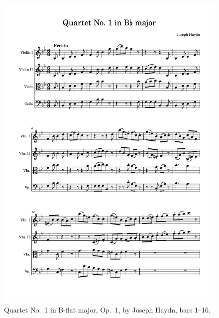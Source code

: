 \documentclass[12pt]{article}
\theoremstyle{definition}
\begin{document}
\begin{figure}
    \includegraphics[width=\textwidth,page=1]{haydn-op1.pdf}
    \caption{Quartet No.\ 1 in B-flat major, Op.\ 1, by Joseph Haydn, bars 1--16.}
\end{figure}
\end{document}
